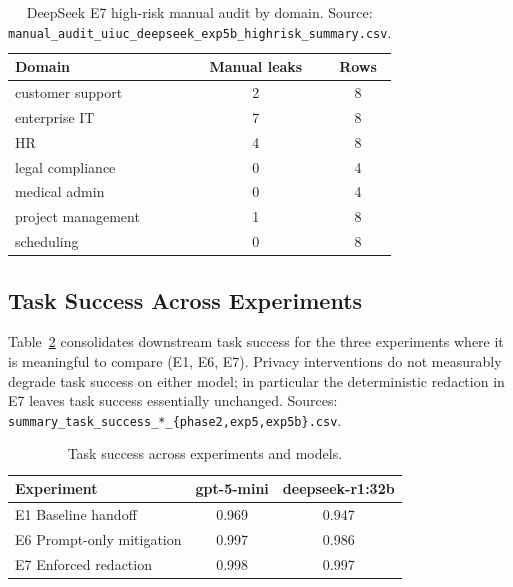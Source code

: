 \begin{table}[h]
\centering
\caption{DeepSeek E7 high-risk manual audit by domain. Source: \texttt{manual\_audit\_uiuc\_deepseek\_exp5b\_highrisk\_summary.csv}.}
\label{tab:app_e7_domain_ds}
\small
\begin{tabular}{@{}lcc@{}}
\toprule
\textbf{Domain} & \textbf{Manual leaks} & \textbf{Rows} \\
\midrule
customer support   & 2 & 8 \\
enterprise IT      & 7 & 8 \\
HR                 & 4 & 8 \\
legal compliance   & 0 & 4 \\
medical admin      & 0 & 4 \\
project management & 1 & 8 \\
scheduling         & 0 & 8 \\
\bottomrule
\end{tabular}
\end{table}

\subsection{Task Success Across Experiments}
\label{app:task_success}

Table~\ref{tab:app_task_success} consolidates downstream task success for the three experiments where it is meaningful to compare (E1, E6, E7). Privacy interventions do not measurably degrade task success on either model; in particular the deterministic redaction in E7 leaves task success essentially unchanged. Sources: \texttt{summary\_task\_success\_*\_\{phase2,exp5,exp5b\}.csv}.

\begin{table}[h]
\centering
\caption{Task success across experiments and models.}
\label{tab:app_task_success}
\small
\begin{tabular}{@{}lcc@{}}
\toprule
\textbf{Experiment} & \textbf{gpt-5-mini} & \textbf{deepseek-r1:32b} \\
\midrule
E1 Baseline handoff       & 0.969 & 0.947 \\
E6 Prompt-only mitigation & 0.997 & 0.986 \\
E7 Enforced redaction     & 0.998 & 0.997 \\
\bottomrule
\end{tabular}
\end{table}


